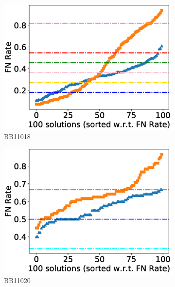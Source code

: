 \begin{figure}[!htbp]
\begin{adjustwidth}{-1cm}{-1cm}
\begin{subfigure}[b]{0.26\textwidth}
			\includegraphics[width=\columnwidth]{Figure/summary/precomputedInit/Balibase/BB11018_fnrate_density_single_run}
			\caption{BB11018}
		\end{subfigure}
		\begin{subfigure}[b]{0.26\textwidth}
			\includegraphics[width=\columnwidth]{Figure/summary/precomputedInit/Balibase/BB11020_fnrate_density_single_run}
			\caption{BB11020}
		\end{subfigure}
		\begin{subfigure}[b]{0.26\textwidth}

\end{subfigure}
\end{adjustwidth}
\end{figure}
